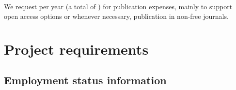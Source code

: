 \documentclass[10pt,fleqn,twoside,a4paper]{article}
\begin{document}
We request  per year (a total of ) for publication
expenses, mainly to support open access options or whenever necessary,
publication in non-free journals.














\section{Project requirements}
\renewcommand{\leftmark}{\sc Project requirements}

\subsection{Employment status information}
\end{document}
